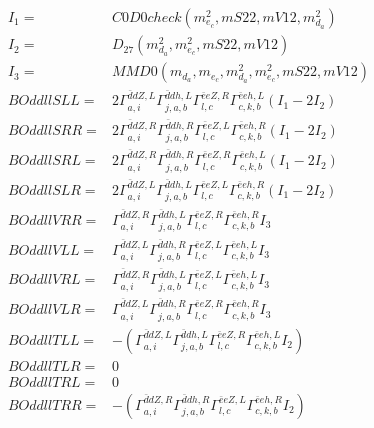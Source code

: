 \documentclass[A4,landscape]{article}
\begin{document}
\begin{align} 
I_1 = & C0D0check(m^2_{e_{{c}}}, mS22, mV12, m^2_{d_{{a}}}) \\ 
I_2 = & D_{27}(m^2_{d_{{a}}}, m^2_{e_{{c}}}, mS22, mV12) \\ 
I_3 = & MMD0(m_{d_{{a}}}, m_{e_{{c}}}, m^2_{d_{{a}}}, m^2_{e_{{c}}}, mS22, mV12) \\ 
  BOddllSLL= & 2  \Gamma^{\bar{d}d Z ,L}_{a, i} \Gamma^{\bar{d}d h ,L}_{j, a, b} \Gamma^{\bar{e}e Z ,R}_{l, c} \Gamma^{\bar{e}e h ,L}_{c, k, b} (I_1 - 2 I_2) \\ 
  BOddllSRR= & 2  \Gamma^{\bar{d}d Z ,R}_{a, i} \Gamma^{\bar{d}d h ,R}_{j, a, b} \Gamma^{\bar{e}e Z ,L}_{l, c} \Gamma^{\bar{e}e h ,R}_{c, k, b} (I_1 - 2 I_2) \\ 
  BOddllSRL= & 2  \Gamma^{\bar{d}d Z ,R}_{a, i} \Gamma^{\bar{d}d h ,R}_{j, a, b} \Gamma^{\bar{e}e Z ,R}_{l, c} \Gamma^{\bar{e}e h ,L}_{c, k, b} (I_1 - 2 I_2) \\ 
  BOddllSLR= & 2  \Gamma^{\bar{d}d Z ,L}_{a, i} \Gamma^{\bar{d}d h ,L}_{j, a, b} \Gamma^{\bar{e}e Z ,L}_{l, c} \Gamma^{\bar{e}e h ,R}_{c, k, b} (I_1 - 2 I_2) \\ 
  BOddllVRR= &  \Gamma^{\bar{d}d Z ,R}_{a, i} \Gamma^{\bar{d}d h ,L}_{j, a, b} \Gamma^{\bar{e}e Z ,R}_{l, c} \Gamma^{\bar{e}e h ,R}_{c, k, b} I_3 \\ 
  BOddllVLL= &  \Gamma^{\bar{d}d Z ,L}_{a, i} \Gamma^{\bar{d}d h ,R}_{j, a, b} \Gamma^{\bar{e}e Z ,L}_{l, c} \Gamma^{\bar{e}e h ,L}_{c, k, b} I_3 \\ 
  BOddllVRL= &  \Gamma^{\bar{d}d Z ,R}_{a, i} \Gamma^{\bar{d}d h ,L}_{j, a, b} \Gamma^{\bar{e}e Z ,L}_{l, c} \Gamma^{\bar{e}e h ,L}_{c, k, b} I_3 \\ 
  BOddllVLR= &  \Gamma^{\bar{d}d Z ,L}_{a, i} \Gamma^{\bar{d}d h ,R}_{j, a, b} \Gamma^{\bar{e}e Z ,R}_{l, c} \Gamma^{\bar{e}e h ,R}_{c, k, b} I_3 \\ 
  BOddllTLL= & -( \Gamma^{\bar{d}d Z ,L}_{a, i} \Gamma^{\bar{d}d h ,L}_{j, a, b} \Gamma^{\bar{e}e Z ,R}_{l, c} \Gamma^{\bar{e}e h ,L}_{c, k, b} I_2) \\ 
  BOddllTLR= & 0 \\ 
  BOddllTRL= & 0 \\ 
  BOddllTRR= & -( \Gamma^{\bar{d}d Z ,R}_{a, i} \Gamma^{\bar{d}d h ,R}_{j, a, b} \Gamma^{\bar{e}e Z ,L}_{l, c} \Gamma^{\bar{e}e h ,R}_{c, k, b} I_2) \\ 
\end{align} 
\end{document}
